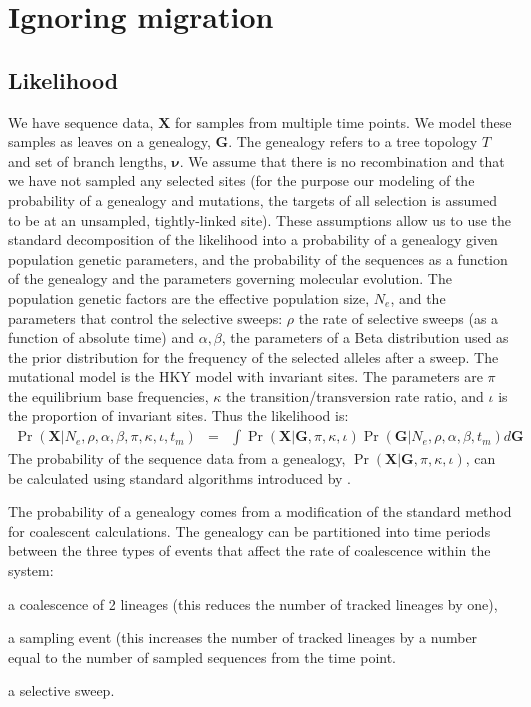 \documentclass[letterpaper]{article}
\newcommand{\genealogy}{{\ensuremath{\mathbf{G}}}}
\newcommand{\sequences}{{\ensuremath{\mathbf{X}}}}
\newcommand{\popsize}{{\ensuremath{N_e}}}
\newcommand{\ratesweep}{{\ensuremath{\rho}}}
\newcommand{\sweepalpha}{{\ensuremath{\alpha}}}
\newcommand{\sweepbeta}{{\ensuremath{\beta}}}
\newcommand{\basefreqs}{{\ensuremath{\pi}}}
\newcommand{\pinvar}{{\ensuremath{\iota}}}
\newcommand{\selectionmodel}{{\ensuremath{\ratesweep,\sweepalpha,\sweepbeta}}}
\newcommand{\mutmodel}{{\ensuremath{\basefreqs,\kappa,\pinvar}}}
\newcommand{\topo}{{\ensuremath{T}}}
\newcommand{\branchlengths}{{\ensuremath{\mathbf{\nu}}}}
\begin{document}
\section{Ignoring migration}
\subsection{Likelihood}
	We have sequence data, $\sequences$ for samples from multiple time points. 
	We model these samples as leaves on a genealogy, $\genealogy$.
	The genealogy refers to a tree topology $\topo$ and set of branch lengths, $\branchlengths$.
	We assume that there is no recombination and that we have not sampled any selected sites (for the purpose our modeling of the probability of a genealogy and mutations, the targets of all selection is assumed to be at an unsampled, tightly-linked site).
	These assumptions allow us to use the standard decomposition of the likelihood into a probability of a genealogy given population genetic parameters, and the probability of the sequences as a function of the genealogy and the parameters governing molecular evolution.
	The population genetic factors are the effective population size, $\popsize$,  and the parameters that control the selective sweeps: $\ratesweep$ the rate of selective sweeps (as a function of absolute time) and $\sweepalpha, \sweepbeta$, the parameters of a Beta distribution used as the prior distribution for the frequency of the selected alleles after a sweep.
	The mutational model is the HKY model with invariant sites. The parameters are $\basefreqs$ the equilibrium base frequencies, $\kappa$ the transition/transversion rate ratio, and $\pinvar$ is the proportion of invariant sites.
	Thus the likelihood is:
\begin{eqnarray}
	\Pr(\sequences|\popsize,\selectionmodel,\mutmodel,t_m) & = & \int\Pr(\sequences| \genealogy,\mutmodel)\Pr(\genealogy |\popsize,\selectionmodel, t_m)d{\genealogy}
\end{eqnarray}
The probability of the sequence data from a genealogy, $\Pr(\sequences| \genealogy,\mutmodel)$, can be calculated using standard algorithms introduced by \cite{Felsenstein1981a}.

The probability of a genealogy comes from a modification of the standard method for coalescent calculations.
The genealogy can be partitioned into time periods between the three types of events that affect the rate of coalescence within the system:
\begin{compactenum}
	\item a coalescence of 2 lineages (this reduces the number of tracked lineages by one),
	\item a sampling event (this increases the number of tracked lineages by a number equal to the number of sampled sequences from the time point.
	\item a selective sweep.
\end{compactenum}
\end{document}
